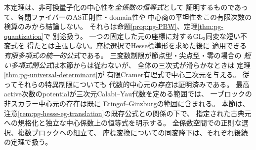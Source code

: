 \begin{remark}
本定理は、非可換量子化の中心性を\emph{全係数の恒等式}として
証明するものであって、各閉ファイバーのAS正則性・domain性や
中心商の平坦性をこの有限次数の検算のみから結論しない。
それらは命題\ref{prop:pg-PBW}、定理\ref{thm:pg-quantization}で
別途扱う。
一つの固定した元の座標に対するGL$_3$同変な短い不変式を
得たとは主張しない。座標選択でHesse標準形を求めた後に
適用できる\emph{有限多項式の統一的公式}である。
三変数制限が節点型・尖点型・零の場合の
\emph{短い多項式閉公式}は本節からは従わないが、
全体の三次式が滑らかなときは
定理\ref{thm:pg-universal-determinant}が
有限Cramer有理式で中心三次元を与える。
従ってそれらの特異制限についても
代数的中心元の\emph{存在}は証明済みである。
最高active次数のpotentialが三次元Calabi--Yau代数を定める範囲では、
一ブロックの非スカラー中心元の存在は既に
Etingof--Ginzburg\cite[Theorem~3.3.2(ii), p.~1385]{EG}の範囲に含まれる。
本節は、注意\ref{rem:pg-hesse-eg-translation}の既存公式との関係の下で、
指定された古典元への規格化と独立な中心係数上の恒等式を明示する。
全係数空間での正則な選択、複数ブロックへの組立て、
座標変換についての同変降下は、それぞれ後続の定理で扱う。
\end{remark}

